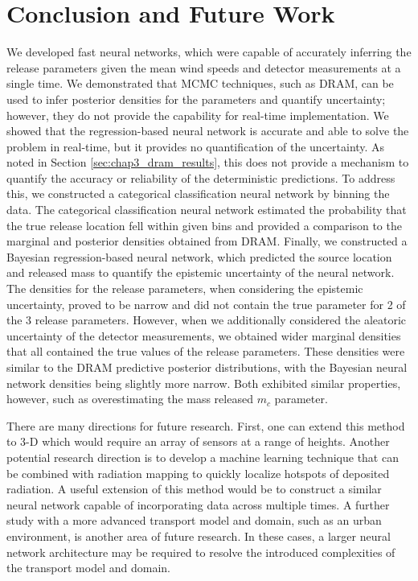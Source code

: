 \documentclass[sn-mathphys-ay]{sn-jnl}
\begin{document}
 \section{Conclusion and Future Work}
 \label{sec:conclusion3}
 We developed fast neural networks, which were capable of accurately inferring the release parameters given the mean wind speeds and detector measurements at a single time. We demonstrated that MCMC techniques, such as DRAM, can be used to infer posterior densities for the parameters and quantify uncertainty; however, they do not provide the capability for real-time implementation. We showed that the regression-based neural network is accurate and able to solve the problem in real-time, but it provides no quantification of the uncertainty. As noted in Section \ref{sec:chap3_dram_results}, this does not provide a mechanism to quantify the accuracy or reliability of the deterministic predictions. To address this, we constructed a categorical classification neural network by binning the data. The categorical classification neural network estimated the probability that the true release location fell within given bins and provided a comparison to the marginal and posterior densities obtained from DRAM. Finally, we constructed a Bayesian regression-based neural network, which predicted the source location and released mass to quantify the epistemic uncertainty of the neural network. The densities for the release parameters, when considering the epistemic uncertainty, proved to be narrow and did not contain the true parameter for 2 of the 3 release parameters. However, when we additionally considered the aleatoric uncertainty of the detector measurements, we obtained wider marginal densities that all contained the true values of the release parameters. These densities were similar to the DRAM predictive posterior distributions, with the Bayesian neural network densities being slightly more narrow. Both exhibited similar properties, however, such as overestimating the mass released $m_c$ parameter. 

There are many directions for future research. First, one can extend this method to 3-D which would require an array of sensors at a range of heights. Another potential research direction is to develop a machine learning technique that can be combined with radiation mapping to quickly localize hotspots of deposited radiation. A useful extension of this method would be to construct a similar neural network capable of incorporating data across multiple times. A further study with a more advanced transport model and domain, such as an urban environment, is another area of future research. In these cases, a larger neural network architecture may be required to resolve the introduced complexities of the transport model and domain.
\end{document}
